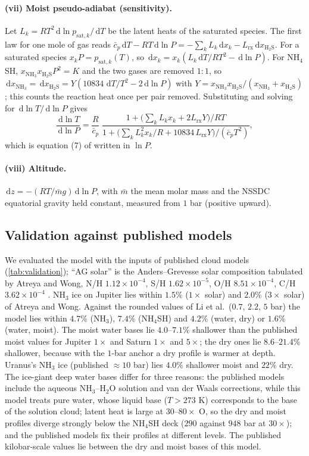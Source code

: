 \documentclass[11pt]{article}
\theoremstyle{definition}\newtheorem{definition}[theorem]{Definition}
\theoremstyle{remark}\newtheorem{remark}[theorem]{Remark}
\newcommand{\dd}{\,\mathrm d}\newcommand{\e}{\mathrm e}
\newcommand{\NH}{\mathrm{NH_3}}\newcommand{\HS}{\mathrm{H_2S}}\newcommand{\NHSH}{\mathrm{NH_4SH}}
\begin{document}
\paragraph{(vii) Moist pseudo-adiabat (sensitivity).} Let $L_k=RT^2\dd\ln p_{\mathrm{sat},k}/\dd T$ be the latent heats of the saturated species. The first law for one mole of gas reads $\bar c_p\dd T-RT\dd\ln P=-\sum_kL_k\dd x_k-L_\mathrm{rx}\dd x_{\HS}$. For a saturated species $x_kP=p_{\mathrm{sat},k}(T)$, so $\dd x_k=x_k(L_k\dd T/RT^2-\dd\ln P)$. For NH$_4$SH, $x_{\NH}x_{\HS}P^2=K$ and the two gases are removed $1{:}1$, so $\dd x_{\NH}=\dd x_{\HS}=Y(10834\,\dd T/T^2-2\dd\ln P)$ with $Y=x_{\NH}x_{\HS}/(x_{\NH}+x_{\HS})$; this counts the reaction heat once per pair removed. Substituting and solving for $\dd\ln T/\dd\ln P$ gives
\[
\frac{\dd\ln T}{\dd\ln P}=\frac R{\bar c_p}\;\frac{1+\bigl(\sum_kL_kx_k+2L_\mathrm{rx}Y\bigr)/RT}{1+\bigl(\sum_kL_k^2x_k/R+10834\,L_\mathrm{rx}Y\bigr)/(\bar c_pT^2)},
\]
which is equation (7) of \cite{AtreyaWong} written in $\ln P$.

\paragraph{(viii) Altitude.} $\dd z=-(RT/\bar m g)\dd\ln P$, with $\bar m$ the mean molar mass and the NSSDC equatorial gravity held constant, measured from $1$ bar (positive upward).

\subsection{Validation against published models}\label{sec:validation}
We evaluated the model with the inputs of published cloud models (\cref{tab:validation}); ``AG solar'' is the Anders--Grevesse solar composition tabulated by Atreya and Wong, N/H $1.12\times10^{-4}$, S/H $1.62\times10^{-5}$, O/H $8.51\times10^{-4}$, C/H $3.62\times10^{-4}$ \cite{AtreyaWong}. NH$_3$ ice on Jupiter lies within $1.5\%$ ($1\times$ solar) and $2.0\%$ ($3\times$ solar) of Atreya and Wong. Against the rounded values of Li et al.\ ($0.7$, $2.2$, $5$ bar) the model lies within $4.7\%$ (NH$_3$), $7.4\%$ (NH$_4$SH) and $4.2\%$ (water, dry) or $1.6\%$ (water, moist). The moist water bases lie $4.0$--$7.1\%$ shallower than the published moist values for Jupiter $1\times$ and Saturn $1\times$ and $5\times$; the dry ones lie $8.6$--$21.4\%$ shallower, because with the $1$-bar anchor a dry profile is warmer at depth. Uranus's NH$_3$ ice (published $\approx10$ bar) lies $4.0\%$ shallower moist and $22\%$ dry. The ice-giant deep water bases differ for three reasons: the published models include the aqueous NH$_3$--H$_2$O solution and van der Waals corrections, while this model treats pure water, whose liquid base ($T>273$ K) corresponds to the base of the solution cloud; latent heat is large at $30$--$80\times$ O, so the dry and moist profiles diverge strongly below the NH$_4$SH deck ($290$ against $948$ bar at $30\times$); and the published models fix their profiles at different levels. The published kilobar-scale values lie between the dry and moist bases of this model.
\end{document}
